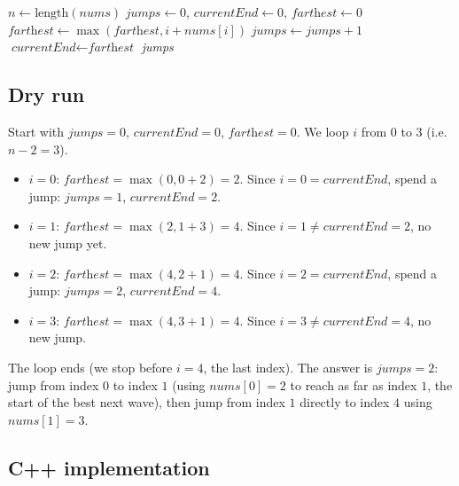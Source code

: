 \begin{algorithm}[H]
\caption{Jump Game II (Minimum Jumps)}
\begin{algorithmic}[1]
  \State $n \gets \text{length}(\textit{nums})$
  \State $\textit{jumps} \gets 0$, $\textit{currentEnd} \gets 0$, $\textit{farthest} \gets 0$
    \State $\textit{farthest} \gets \max(\textit{farthest}, i + \textit{nums}[i])$
      \State $\textit{jumps} \gets \textit{jumps} + 1$
      \State $\textit{currentEnd} \gets \textit{farthest}$
    \EndIf
  \EndFor
  \State \Return \textit{jumps}
\EndProcedure
\end{algorithmic}
\end{algorithm}

\subsection*{Dry run}


Start with $\textit{jumps}=0$, $\textit{currentEnd}=0$,
$\textit{farthest}=0$. We loop $i$ from $0$ to $3$ (i.e.\ $n-2=3$).

\begin{itemize}
  \item $i=0$: $\textit{farthest} = \max(0, 0+2) = 2$. Since
        $i = 0 = \textit{currentEnd}$, spend a jump: $\textit{jumps}=1$,
        $\textit{currentEnd} = 2$.
  \item $i=1$: $\textit{farthest} = \max(2, 1+3) = 4$. Since
        $i = 1 \ne \textit{currentEnd}=2$, no new jump yet.
  \item $i=2$: $\textit{farthest} = \max(4, 2+1) = 4$. Since
        $i = 2 = \textit{currentEnd}$, spend a jump: $\textit{jumps}=2$,
        $\textit{currentEnd} = 4$.
  \item $i=3$: $\textit{farthest} = \max(4, 3+1) = 4$. Since
        $i = 3 \ne \textit{currentEnd}=4$, no new jump.
\end{itemize}

The loop ends (we stop before $i=4$, the last index). The answer is
$\textit{jumps} = 2$: jump from index $0$ to index $1$ (using $\textit{nums}[0]=2$
to reach as far as index $1$, the start of the best next wave), then jump
from index $1$ directly to index $4$ using $\textit{nums}[1]=3$.

\subsection*{C++ implementation}

